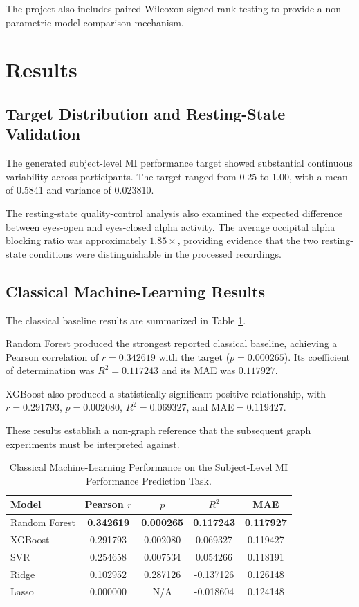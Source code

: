 \documentclass[conference]{IEEEtran}
\begin{document}
The project also includes paired Wilcoxon signed-rank testing to provide a non-parametric model-comparison mechanism.

\section{Results}
\subsection{Target Distribution and Resting-State Validation}
The generated subject-level MI performance target showed substantial continuous variability across participants. The target ranged from 0.25 to 1.00, with a mean of 0.5841 and variance of 0.023810.

The resting-state quality-control analysis also examined the expected difference between eyes-open and eyes-closed alpha activity. The average occipital alpha blocking ratio was approximately $1.85\times$, providing evidence that the two resting-state conditions were distinguishable in the processed recordings.

\subsection{Classical Machine-Learning Results}
The classical baseline results are summarized in Table \ref{tab:classical}.

Random Forest produced the strongest reported classical baseline, achieving a Pearson correlation of $r = 0.342619$ with the target ($p = 0.000265$). Its coefficient of determination was $R^2 = 0.117243$ and its MAE was $0.117927$.

XGBoost also produced a statistically significant positive relationship, with $r = 0.291793$, $p = 0.002080$, $R^2 = 0.069327$, and $\text{MAE} = 0.119427$.

These results establish a non-graph reference that the subsequent graph experiments must be interpreted against.

\begin{table}[b]
\caption{Classical Machine-Learning Performance on the Subject-Level MI Performance Prediction Task.}
\label{tab:classical}
\centering
\begin{tabular}{lcccc}
\toprule
Model & Pearson $r$ & $p$ & $R^2$ & MAE \\
\midrule
Random Forest & \textbf{0.342619} & \textbf{0.000265} & \textbf{0.117243} & \textbf{0.117927} \\
XGBoost       & 0.291793          & 0.002080          & 0.069327          & 0.119427          \\
SVR           & 0.254658          & 0.007534          & 0.054266          & 0.118191          \\
Ridge         & 0.102952          & 0.287126          & -0.137126         & 0.126148          \\
Lasso         & 0.000000          & N/A               & -0.018604         & 0.124148          \\
\bottomrule
\end{tabular}
\end{table}
\end{document}
